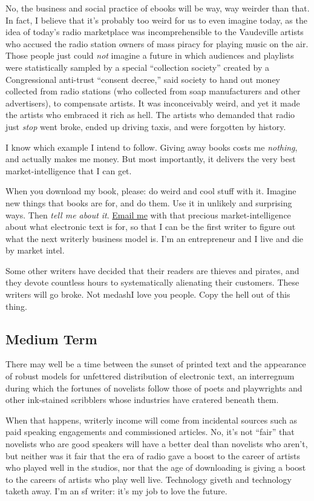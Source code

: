 No, the business and social practice of ebooks will be way, way
weirder than that.  In fact, I believe that it's probably too weird
for us to even imagine today, as the idea of today's radio marketplace
was incomprehensible to the Vaudeville artists who accused the radio
station owners of mass piracy for playing music on the air.  Those
people just could \textit{not} imagine a future in which audiences and
playlists were statistically sampled by a special ``collection
society'' created by a Congressional anti-trust ``consent decree,''
said society to hand out money collected from radio stations (who
collected from soap manufacturers and other advertisers), to
compensate artists.  It was inconceivably weird, and yet it made the
artists who embraced it rich as hell.  The artists who demanded that
radio just \textit{stop} went broke, ended up driving taxis, and were
forgotten by history. 

I know which example I intend to follow.  Giving away books costs me
\textit{nothing}, and actually makes me money.  But most importantly,
it delivers the very best market-intelligence that I can get. 

When you download my book, please:  do weird and cool stuff with it. 
Imagine new things that books are for, and do them.  Use it in
unlikely and surprising ways.  Then \textit{tell me about it}. 
\href{mailto:doctorow@craphound.com}{Email me} with that precious
market-intelligence about what electronic text is for, so that I can
be the first writer to figure out what the next writerly business
model is.  I'm an entrepreneur and I live and die by market intel.

Some other writers have decided that their readers are thieves and
pirates, and they devote countless hours to systematically alienating
their customers.  These writers will go broke.  Not medash{}I love you
people.  Copy the hell out of this thing.

\subsection{Medium Term}

There may well be a time between the sunset of printed text and the
appearance of robust models for unfettered distribution of electronic
text, an interregnum during which the fortunes of novelists follow
those of poets and playwrights and other ink-stained scribblers whose
industries have cratered beneath them.

When that happens, writerly income will come from incidental sources
such as paid speaking engagements and commissioned articles.  No, it's
not ``fair'' that novelists who are good speakers will have a better
deal than novelists who aren't, but neither was it fair that the era
of radio gave a boost to the career of artists who played well in the
studios, nor that the age of downloading is giving a boost to the
careers of artists who play well live.  Technology giveth and
technology taketh away.  I'm an sf writer:  it's my job to love the
future.

